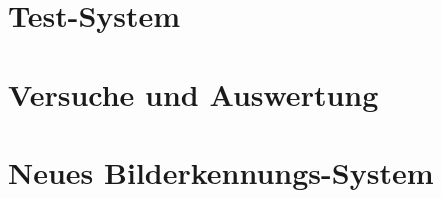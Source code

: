 

\chapter{Test-System}
\label{sec:TestSystem}


\chapter{Versuche und Auswertung}
\label{sec:VersucheUndAuswertung}

\chapter{Neues Bilderkennungs-System}
\label{sec:NeuesBilderkennungsSystem}



\appendix
{}
												




\listoffigures											%
\listoftables												%


\pagestyle{empty}


